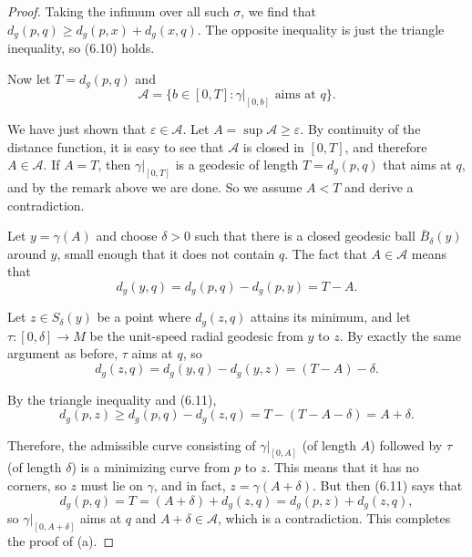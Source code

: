\begin{proof}
Taking the infimum over all such $\sigma$, we find that $d_g(p, q) \geq d_g(p, x) + d_g(x, q)$. The opposite inequality is just the triangle inequality, so (6.10) holds.

Now let $T = d_g(p, q)$ and
\[
\mathcal{A} = \{b \in [0, T] : \gamma|_{[0,b]} \text{ aims at } q\}.
\]

We have just shown that $\varepsilon \in \mathcal{A}$. Let $A = \sup \mathcal{A} \geq \varepsilon$. By continuity of the distance function, it is easy to see that $\mathcal{A}$ is closed in $[0, T]$, and therefore $A \in \mathcal{A}$. If $A = T$, then $\gamma|_{[0,T]}$ is a geodesic of length $T = d_g(p, q)$ that aims at $q$, and by the remark above we are done. So we assume $A < T$ and derive a contradiction.


Let $y = \gamma(A)$ and choose $\delta > 0$ such that there is a closed geodesic ball $\bar{B}_\delta(y)$ around $y$, small enough that it does not contain $q$. The fact that $A \in \mathcal{A}$ means that
\[
d_g(y, q) = d_g(p, q) - d_g(p, y) = T - A.
\]

Let $z \in S_\delta(y)$ be a point where $d_g(z, q)$ attains its minimum, and let $\tau : [0, \delta] \to M$ be the unit-speed radial geodesic from $y$ to $z$. By exactly the same argument as before, $\tau$ aims at $q$, so
\begin{equation}
d_g(z, q) = d_g(y, q) - d_g(y, z) = (T - A) - \delta. \tag{6.11}
\end{equation}

By the triangle inequality and (6.11),
\[
d_g(p, z) \geq d_g(p, q) - d_g(z, q) = T - (T - A - \delta) = A + \delta.
\]

Therefore, the admissible curve consisting of $\gamma|_{[0,A]}$ (of length $A$) followed by $\tau$ (of length $\delta$) is a minimizing curve from $p$ to $z$. This means that it has no corners, so $z$ must lie on $\gamma$, and in fact, $z = \gamma(A + \delta)$. But then (6.11) says that
\[
d_g(p, q) = T = (A + \delta) + d_g(z, q) = d_g(p, z) + d_g(z, q),
\]
so $\gamma|_{[0,A+\delta]}$ aims at $q$ and $A + \delta \in \mathcal{A}$, which is a contradiction. This completes the proof of (a).



\end{proof}
